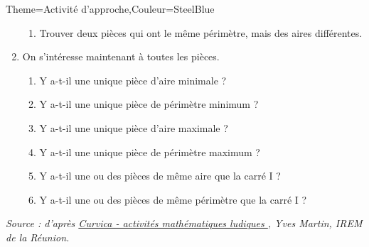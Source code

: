 \begin{Maquette}[Cours]{Theme={Activité d'approche},Couleur={SteelBlue}}
\begin{AActivite}
\begin{spacing}{1.9}
\begin{enumerate}
\begin{enumerate}
                     \item Trouver deux pièces qui ont le même périmètre, mais des aires différentes. \pointilles 
                  \end{enumerate}
               \item On s'intéresse maintenant à toutes les pièces.
                  \begin{enumerate}
                     \item Y a-t-il une unique pièce d’aire minimale ? \pointilles
                     \item Y a-t-il une unique pièce de périmètre minimum ? \pointilles             
                     \item Y a-t-il une unique pièce d’aire maximale ? \pointilles           
                     \item Y a-t-il une unique pièce de périmètre maximum ? \pointilles         
                     \item Y a-t-il une ou des pièces de même aire que la carré I ? \pointilles
                     \item Y a-t-il une ou des pièces de même périmètre que la carré I ? \pointilles
                  \end{enumerate}
            \end{enumerate}
            \vskip-10mm
         \end{spacing}

      \end{AActivite}

   \vfill\hfill{\it\footnotesize Source : d'après \href{https://irem.univ-reunion.fr/spip.php?article802}{\og Curvica - activités mathématiques ludiques \fg}, Yves Martin, IREM de la Réunion.}

\end{Maquette}


